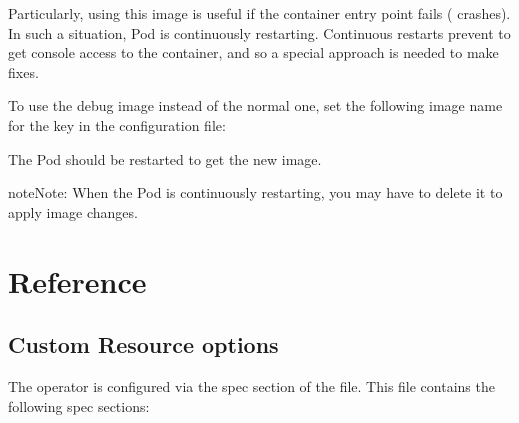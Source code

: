 \documentclass[letterpaper,10pt,english]{sphinxmanual}
\begin{document}
Particularly, using this image is useful if the container entry point fails
( crashes). In such a situation, Pod is continuously restarting.
Continuous restarts prevent to get console access to the container,
and so a special approach is needed to make fixes.

To use the debug image instead of the normal one, set the following image name
for the  key in the  configuration file:
\begin{quote}

\end{quote}

The Pod should be restarted to get the new image.

\begin{sphinxadmonition}{note}{Note:}
When the Pod is continuously restarting, you may have to delete it
to apply image changes.
\end{sphinxadmonition}


\part{Reference}
\label{\detokenize{index:reference}}

\chapter{Custom Resource options}
\label{\detokenize{operator:custom-resource-options}}\label{\detokenize{operator:operator-custom-resource-options}}\label{\detokenize{operator::doc}}
The operator is configured via the spec section of the
file. This file contains the following spec sections:
\end{document}
